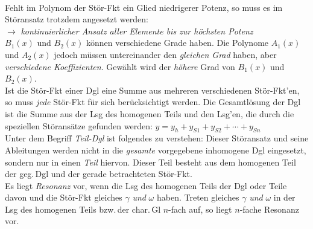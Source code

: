 \documentclass[a4paper,10pt,titlepage]{scrartcl}
\begin{document}
\smallskip\\
Fehlt im Polynom der Stör-Fkt ein Glied niedrigerer Potenz, so muss es im Störansatz trotzdem angesetzt werden:\\
\indent $\to$ \emph{kontinuierlicher Ansatz aller Elemente bis zur höchsten Potenz}
\smallskip\\
$B_1(x)$ und $B_2(x)$ können verschiedene Grade haben. Die Polynome $A_1(x)$ und $A_2(x)$ jedoch müssen untereinander den \emph{gleichen Grad} haben, aber \emph{verschiedene Koeffizienten}. Gewählt wird der \emph{höhere} Grad von $B_1(x)$ und $B_2(x)$.
\smallskip\\
Ist die Stör-Fkt einer Dgl eine Summe aus mehreren verschiedenen Stör-Fkt'en, so muss \emph{jede} Stör-Fkt für sich berücksichtigt werden. Die Gesamtlösung der Dgl ist die Summe aus der Lsg des homogenen Teils und den Lsg'en, die durch die speziellen Störansätze gefunden werden: $y=y_h+y_{S1}+y_{S2}+\cdots+y_{Sn}$\\
Unter dem Begriff \emph{Teil-Dgl} ist folgendes zu verstehen: Dieser Störansatz und seine Ableitungen werden nicht in die \emph{gesamte} vorgegebene inhomogene Dgl eingesetzt, sondern nur in einen \emph{Teil} hiervon. Dieser Teil besteht aus dem homogenen Teil der geg.\,Dgl und der gerade betrachteten Stör-Fkt.
\smallskip\\
Es liegt \emph{Resonanz} vor, wenn die Lsg des homogenen Teils der Dgl oder Teile davon und die Stör-Fkt gleiches $\gamma$ \emph{und} $\omega$ haben. Treten gleiches $\gamma$ \emph{und} $\omega$ in der Lsg des homogenen Teils bzw.\,der char.\,Gl $n$-fach auf, so liegt $n$-fache Resonanz vor.
\end{document}
